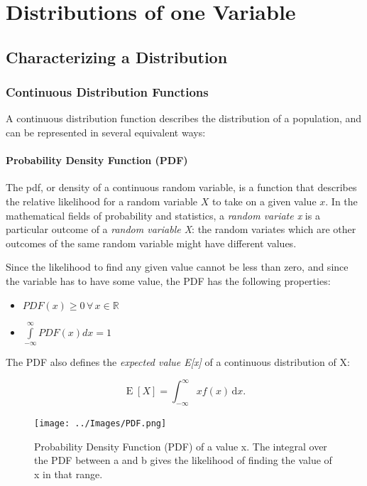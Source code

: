 \chapter{Distributions of one Variable}


\section{Characterizing a Distribution}

\subsection{Continuous Distribution Functions}

A continuous distribution function describes the \Gls{distribution} of a population, and can be represented in several equivalent ways:

\subsubsection{Probability Density Function (PDF)}
The \acrfull{pdf}, or density of a continuous random variable, is a function that describes the relative likelihood for a random variable $X$ to take on a given value $x$.
In the mathematical fields of probability and statistics, a \emph{random variate x}  is a particular outcome of a \emph{random variable X}: the random variates which are other outcomes of the same random variable might have different values.

Since the likelihood to find any given value cannot be less than zero, and since the variable has to have some value, the PDF has the following properties:

\begin{itemize}
  \item $PDF(x) \geq 0\,\forall \,x \in \mathbb{R}$
  \item $ \int\limits_{ - \infty }^\infty  {PDF(x)dx = 1} $
\end{itemize}

The PDF also defines the \emph{expected value E[x]}  of a continuous distribution of X:

\begin{equation}\label{eq:expectedValue}
   \operatorname{E}[X] = \int_{-\infty}^\infty x f(x)\, \mathrm{d}x .
\end{equation}

\begin{figure}
  \centering
  \texttt{[image: ../Images/PDF.png]}\\
  \caption{Probability Density Function (PDF) of a value x. The integral over the PDF between a and b gives the likelihood of finding the value of x in that range.}\label{fig:PDF}
\end{figure}

